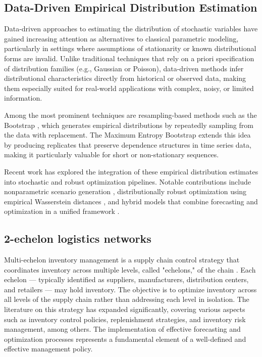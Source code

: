 \documentclass[ijoc,sglanonrev]{informs4}
\begin{document}
\subsection{Data-Driven Empirical Distribution Estimation}

Data-driven approaches to estimating the distribution of stochastic variables have gained increasing attention as alternatives to classical parametric modeling, particularly in settings where assumptions of stationarity or known distributional forms are invalid. Unlike traditional techniques that rely on a priori specification of distribution families (e.g., Gaussian or Poisson), data-driven methods infer distributional characteristics directly from historical or observed data, making them especially suited for real-world applications with complex, noisy, or limited information.

Among the most prominent techniques are resampling-based methods such as the Bootstrap \cite{b1}, which generates empirical distributions by repeatedly sampling from the data with replacement. The Maximum Entropy Bootstrap \cite{Vinod2006} extends this idea by producing replicates that preserve dependence structures in time series data, making it particularly valuable for short or non-stationary sequences.

Recent work has explored the integration of these empirical distribution estimates into stochastic and robust optimization pipelines. Notable contributions include nonparametric scenario generation \cite{BM11}, distributionally robust optimization using empirical Wasserstein distances \cite{EK17}, and hybrid models that combine forecasting and optimization in a unified framework \cite{BK19}. 


\subsection{2-echelon logistics networks}

Multi-echelon inventory management is a supply chain control strategy that coordinates inventory across multiple levels, called "echelons," of the chain \citep{Clark60}. Each echelon — typically identified as suppliers, manufacturers, distribution centers, and retailers — may hold inventory. The objective is to optimize inventory across all levels of the supply chain rather than addressing each level in isolation. The literature on this strategy has expanded significantly, covering various aspects such as inventory control policies, replenishment strategies, and inventory risk management, among others. The implementation of effective forecasting and optimization processes represents a fundamental element of a well-defined and effective management policy. 
\end{document}
